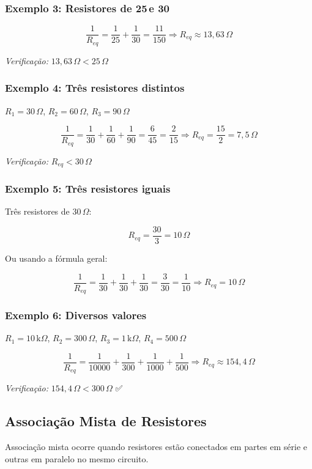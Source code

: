\subsubsection{Exemplo 3: Resistores de 25\,\Omega e 30\,\Omega}
\[
\frac{1}{R_{eq}} = \frac{1}{25} + \frac{1}{30}
= \frac{11}{150}
\Rightarrow R_{eq} \approx 13{,}63\,\Omega
\]

\textit{Verificação:} $13{,}63\,\Omega < 25\,\Omega$

\subsubsection{Exemplo 4: Três resistores distintos}
$R_1 = 30\,\Omega$, $R_2 = 60\,\Omega$, $R_3 = 90\,\Omega$

\[
\frac{1}{R_{eq}} = \frac{1}{30} + \frac{1}{60} + \frac{1}{90}
= \frac{6}{45} = \frac{2}{15}
\Rightarrow R_{eq} = \frac{15}{2} = 7{,}5\,\Omega
\]

\textit{Verificação:} $R_{eq} < 30\,\Omega$

\subsubsection{Exemplo 5: Três resistores iguais}
Três resistores de $30\,\Omega$:

\[
R_{eq} = \frac{30}{3} = 10\,\Omega
\]

Ou usando a fórmula geral:

\[
\frac{1}{R_{eq}} = \frac{1}{30} + \frac{1}{30} + \frac{1}{30}
= \frac{3}{30} = \frac{1}{10}
\Rightarrow R_{eq} = 10\,\Omega
\]

\subsubsection{Exemplo 6: Diversos valores}
$R_1 = 10\,\text{k}\Omega$, $R_2 = 300\,\Omega$, $R_3 = 1\,\text{k}\Omega$, $R_4 = 500\,\Omega$

\[
\frac{1}{R_{eq}} = \frac{1}{10000} + \frac{1}{300} + \frac{1}{1000} + \frac{1}{500}
\Rightarrow R_{eq} \approx 154{,}4\,\Omega
\]

\textit{Verificação:} $154{,}4\,\Omega < 300\,\Omega$ ✅

\subsection{Associação Mista de Resistores}
Associação mista ocorre quando resistores estão conectados em partes em série e outras em paralelo no mesmo circuito.

